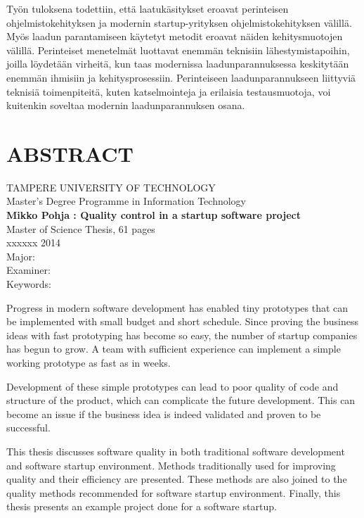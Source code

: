 \noindent
Työn tuloksena todettiin, että laatukäsitykset eroavat perinteisen ohjelmistokehityksen ja modernin startup-yrityksen ohjelmistokehityksen välillä. Myös laadun parantamiseen käytetyt metodit eroavat näiden kehitysmuotojen välillä. Perinteiset menetelmät luottavat enemmän teknisiin lähestymistapoihin, joilla löydetään virheitä, kun taas modernissa laadunparannuksessa keskitytään enemmän ihmisiin ja kehitysprosessiin. Perinteiseen laadunparannukseen liittyviä teknisiä toimenpiteitä, kuten katselmointeja ja erilaisia testausmuotoja, voi kuitenkin soveltaa modernin laadunparannuksen osana. 

\newpage
\chapter*{ABSTRACT}
\begin{spacing}{1.0}
\textsf{TAMPERE UNIVERSITY OF TECHNOLOGY}\\
\textsf{Master's Degree Programme in Information Technology}\\
{\bf \textsf{Mikko Pohja : Quality control in a startup software project}}\\
\textsf{Master of Science Thesis, 61 pages}\\
\textsf{xxxxxx 2014}\\
\textsf{Major: }\\
\textsf{Examiner: }\\
\textsf{Keywords: }\\
\end{spacing}
 
\noindent
Progress in modern software development has enabled tiny prototypes that can be implemented with small budget and short schedule. Since proving the business ideas with fast prototyping has become so easy, the number of startup companies has begun to grow. A team with sufficient experience can implement a simple working prototype as fast as in weeks.
 
\noindent
Development of these simple prototypes can lead to poor quality of code and structure of the product, which can complicate the future development. This can become an issue if the business idea is indeed validated and proven to be successful.

\noindent
This thesis discusses software quality in both traditional software development and software startup environment. Methods traditionally used for improving quality and their efficiency are presented. These methods are also joined to the quality methods recommended for software startup environment. Finally, this thesis presents an example project done for a software startup.

